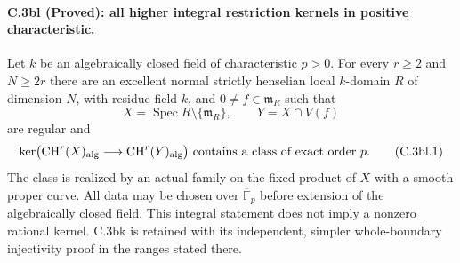 

\paragraph{C.3bl (Proved): all higher integral restriction kernels in positive characteristic.}
Let $k$ be an algebraically closed field of characteristic $p>0$.
For every $r\ge2$ and $N\ge2r$ there are an excellent normal
strictly henselian local $k$-domain $R$ of dimension $N$, with residue
field $k$, and $0\ne f\in\mathfrak m_R$ such that
\[
 X=\operatorname{Spec}R\setminus\{\mathfrak m_R\},\qquad
 Y=X\cap V(f)
\]
are regular and
\[
 \ker\bigl(\mathrm{CH}^r(X)_{\rm alg}
             \longrightarrow\mathrm{CH}^r(Y)_{\rm alg}\bigr)
 \text{ contains a class of exact order }p.
 \tag{C.3bl.1}
\]
The class is realized by an actual family on the fixed product of
$X$ with a smooth proper curve. All data may be chosen over
$\overline{\mathbb F}_p$ before extension of the algebraically
closed field. This integral statement does not imply a nonzero
rational kernel. C.3bk is retained with its independent, simpler
whole-boundary injectivity proof in the ranges stated there.

